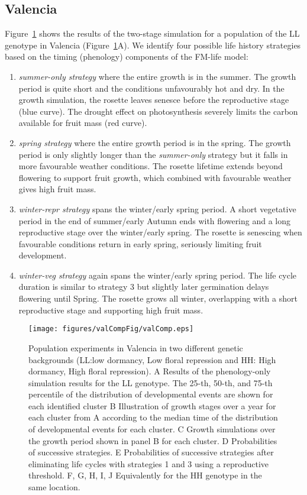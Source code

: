 \subsection{Valencia}
\label{valencia}
Figure~\ref{fig:valComp} shows the results of the two-stage simulation for a population
of the LL genotype in Valencia (Figure~\ref{fig:valComp}A). We identify four possible
life history strategies based on the timing (phenology) components of
the FM-life model:
\begin{enumerate}
\def\labelenumi{\arabic{enumi}.}
\item
  \emph{summer-only strategy} where the entire growth is in the summer.
  The growth period is quite short and the conditions unfavourably hot
  and dry. In the growth simulation, the rosette leaves senesce before
  the reproductive stage (blue curve). The drought effect on
  photosynthesis severely limits the carbon available for fruit mass
  (red curve).
\item
  \emph{spring strategy} where the entire growth period is in the
  spring. The growth period is only slightly longer than the
  \emph{summer-only} strategy but it falls in more favourable weather
  conditions. The rosette lifetime extends beyond flowering to support
  fruit growth, which combined with favourable weather gives high fruit
  mass.
\item
  \emph{winter-repr strategy} spans the winter/early spring period. A
  short vegetative period in the end of summer/early Autumn ends with
  flowering and a long reproductive stage over the winter/early spring.
  The rosette is senescing when favourable conditions return in early
  spring, seriously limiting fruit development.
\item
  \emph{winter-veg strategy} again spans the winter/early spring period.
  The life cycle duration is similar to strategy 3 but slightly later
  germination delays flowering until Spring. The rosette grows all
  winter, overlapping with a short reproductive stage and supporting
  high fruit mass.
\end{enumerate}

\begin{figure}[p]
\texttt{[image: figures/valCompFig/valComp.eps]}
\caption{Population experiments in Valencia in two different genetic backgrounds
  (LL:low dormancy, Low floral repression and HH: High dormancy, High floral
  repression). A Results of the phenology-only simulation results for the LL
  genotype. The 25-th, 50-th, and 75-th percentile of the distribution of
  developmental events are shown for each identified cluster B Illustration of
  growth stages over a year for each cluster from A according to the median time
  of the distribution of developmental events for each cluster. C Growth
  simulations over the growth period shown in panel B for each cluster.  D
  Probabilities of successive strategies. E Probabilities of successive
  strategies after eliminating life cycles with strategies 1 and 3 using a
  reproductive threshold. F, G, H, I, J Equivalently for the HH genotype in the
  same location.}
\label{fig:valComp}
\end{figure}


